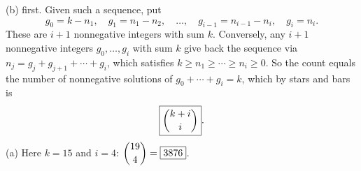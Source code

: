 (b) first. Given such a sequence, put
\[
g_0=k-n_1,\quad g_1=n_1-n_2,\quad\dots,\quad g_{i-1}=n_{i-1}-n_i,\quad g_i=n_i .
\]
These are $i+1$ nonnegative integers with sum $k$. Conversely, any $i+1$ nonnegative integers $g_0,\dots,g_i$ with sum $k$ give back the sequence via $n_j=g_j+g_{j+1}+\cdots+g_i$, which satisfies $k\ge n_1\ge\cdots\ge n_i\ge0$. So the count equals the number of nonnegative solutions of $g_0+\cdots+g_i=k$, which by stars and bars is
\[
\boxed{\dbinom{k+i}{i}} .
\]
(a) Here $k=15$ and $i=4$: $\dbinom{19}{4}=\boxed{3876}$.
